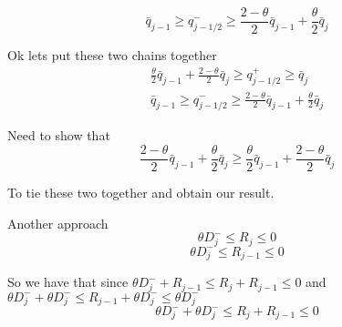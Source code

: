 \documentclass[10pt]{article}
\begin{document}
\[\bar{q}_{j-1} \ge q^-_{j-1/2} \ge \frac{2 - \theta}{2}\bar{q}_{j-1} +  \frac{\theta}{2} \bar{q}_{j}   \]

Ok lets put these two chains together
\begin{align}
\frac{\theta}{2} \bar{q}_{j-1} + \frac{2 - \theta}{2}\bar{q}_{j}  \ge q^+_{j-1/2} \ge \bar{q}_{j} \\
\bar{q}_{j-1} \ge q^-_{j-1/2} \ge \frac{2 - \theta}{2}\bar{q}_{j-1} +  \frac{\theta}{2} \bar{q}_{j} 
\end{align}


Need to show that
\[\frac{2 - \theta}{2}\bar{q}_{j-1} +  \frac{\theta}{2} \bar{q}_{j}  \ge \frac{\theta}{2} \bar{q}_{j-1} + \frac{2 - \theta}{2}\bar{q}_{j} \]

To tie these two together and obtain our result. 


%
%
%
%




%
%
%  

Another approach
\[\theta D^-_{j} \le R_j \le 0\]
\[\theta D^-_{j} \le R_{j-1} \le 0\]

So we have that since $\theta D^-_{j}  + R_{j-1} \le R_j + R_{j-1} \le 0$ and  $\theta D^-_{j} + \theta D^-_{j} \le R_{j-1} + \theta D^-_{j} \le \theta D^-_{j}$
\[\theta D^-_{j} + \theta D^-_{j} \le R_j + R_{j-1} \le 0 \]
\end{document}

